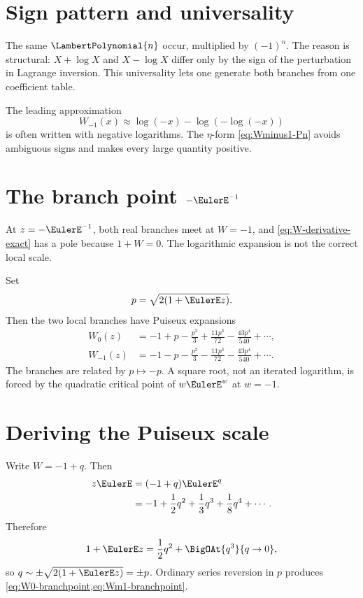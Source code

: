 \documentclass[11pt,openany]{book}
\theoremstyle{definition}
\theoremstyle{plain}
\theoremstyle{remark}
\begin{document}
\section{Sign pattern and universality}
The same \(\LambertPolynomial{n}\) occur, multiplied by \((-1)^n\). The reason is structural: \(X+\log X\) and \(X-\log X\) differ only by the sign of the perturbation in Lagrange inversion. This universality lets one generate both branches from one coefficient table.

The leading approximation
\[
 W_{-1}(x)\approx \log(-x)-\log(-\log(-x))
\]
is often written with negative logarithms. The \(\eta\)-form \cref{eq:Wminus1-Pn} avoids ambiguous signs and makes every large quantity positive.

\section{The branch point \texorpdfstring{\(-\EulerE^{-1}\)}{-1/e}}
At \(z=-\EulerE^{-1}\), both real branches meet at \(W=-1\), and \cref{eq:W-derivative-exact} has a pole because \(1+W=0\). The logarithmic expansion is not the correct local scale.

Set
\begin{equation}\label{eq:p-branchpoint}
 p=\sqrt{2(1+\EulerE z)}.
\end{equation}
Then the two local branches have Puiseux expansions
\begin{align}
 W_0(z)&=-1+p-\frac{p^2}{3}
 +\frac{11p^3}{72}-\frac{43p^4}{540}+\cdots,
 \label{eq:W0-branchpoint}\\
 W_{-1}(z)&=-1-p-\frac{p^2}{3}
 -\frac{11p^3}{72}-\frac{43p^4}{540}+\cdots.
 \label{eq:Wm1-branchpoint}
\end{align}
The branches are related by \(p\mapsto-p\). A square root, not an iterated logarithm, is forced by the quadratic critical point of \(w\EulerE^w\) at \(w=-1\).

\section{Deriving the Puiseux scale}
Write \(W=-1+q\). Then
\begin{align*}
 z\EulerE&=(-1+q)\EulerE^q\\
 &=-1+\frac12q^2+\frac13q^3+\frac18q^4+\cdots.
\end{align*}
Therefore
\[
 1+\EulerE z=\frac12q^2+\BigOAt{q^3}{q\to0},
\]
so \(q\sim\pm\sqrt{2(1+\EulerE z)}=\pm p\). Ordinary series reversion in \(p\) produces \cref{eq:W0-branchpoint,eq:Wm1-branchpoint}.
\end{document}
